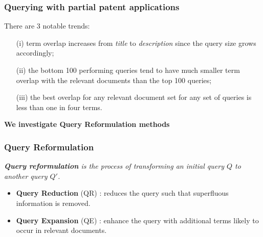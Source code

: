 \documentclass[xcolor=x11names,compress]{beamer}
\renewcommand{\(}{\begin{columns}}
\renewcommand{\)}{\end{columns}}
\newcommand{\<}[1]{\begin{column}{#1}}
\renewcommand{\>}{\end{column}}
\begin{document}
\begin{frame}
\frametitle{Querying with partial patent applications}
There are 3 notable trends:
\begin{itemize}
\item[(i)]   term overlap increases from \textit{title} to \textit{description}
since the query size grows accordingly; 
\item[(ii)]  the bottom 100 performing queries tend to have much smaller term overlap with the relevant documents than the top 100 queries; 
\item[(iii)] the best overlap for any relevant
document set for any set of queries is less than one in four terms.
\end{itemize}

\begin{center}
{\color{DeepSkyBlue4}\textbf{We investigate Query Reformulation methods}}
\end{center}
\end{frame}



\begin{frame}
\frametitle{Query Reformulation}

{\color{DeepSkyBlue4}\textit{\textbf{Query reformulation} is the process of transforming an initial query $Q$ to another query $Q'$.}}

\begin{itemize}
\item \textbf{Query Reduction} (QR) \cite{Kumaran2009}: reduces the query such that superfluous information is removed.
\item \textbf{Query Expansion} (QE) \cite{Efthimiadis1996}: enhance the query with additional terms likely to occur in relevant documents.
\end{itemize}

\end{frame}
\end{document}

